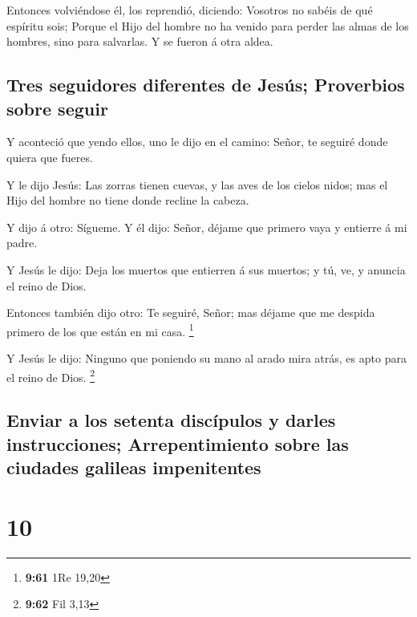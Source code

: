  Entonces volviéndose él, los reprendió, diciendo: Vosotros
no sabéis de qué espíritu sois;  Porque el Hijo del hombre
no ha venido para perder las almas de los hombres, sino para salvarlas.
Y se fueron á otra aldea.

\hypertarget{tres-seguidores-diferentes-de-jesuxfas-proverbios-sobre-seguir}{%
\subsection{Tres seguidores diferentes de Jesús; Proverbios sobre
seguir}\label{tres-seguidores-diferentes-de-jesuxfas-proverbios-sobre-seguir}}

 Y aconteció que yendo ellos, uno le dijo en el camino:
Señor, te seguiré donde quiera que fueres.

 Y le dijo Jesús: Las zorras tienen cuevas, y las aves de
los cielos nidos; mas el Hijo del hombre no tiene donde recline la
cabeza.

 Y dijo á otro: Sígueme. Y él dijo: Señor, déjame que
primero vaya y entierre á mi padre.

 Y Jesús le dijo: Deja los muertos que entierren á sus
muertos; y tú, ve, y anuncia el reino de Dios.

 Entonces también dijo otro: Te seguiré, Señor; mas déjame
que me despida primero de los que están en mi casa. \footnote{\textbf{9:61}
  1Re 19,20}

 Y Jesús le dijo: Ninguno que poniendo su mano al arado
mira atrás, es apto para el reino de Dios. \footnote{\textbf{9:62} Fil
  3,13}

\hypertarget{enviar-a-los-setenta-discuxedpulos-y-darles-instrucciones-arrepentimiento-sobre-las-ciudades-galileas-impenitentes}{%
\subsection{Enviar a los setenta discípulos y darles instrucciones;
Arrepentimiento sobre las ciudades galileas
impenitentes}\label{enviar-a-los-setenta-discuxedpulos-y-darles-instrucciones-arrepentimiento-sobre-las-ciudades-galileas-impenitentes}}

\hypertarget{section-9}{%
\section{10}\label{section-9}}

